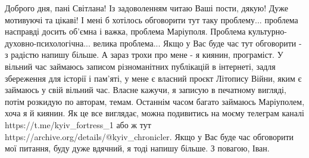  
 
 
 
 

Доброго дня, пані Світлана! Із задоволенням читаю Ваші пости, дякую! Дуже
мотивуючі та цікаві! І мені б хотілось обговорити тут таку проблему... проблема
насправді досить об'ємна і важка, проблема Маріуполя. Проблема
культурно-духовно-психологічна... велика проблема... Якщо у Вас буде час тут
обговорити - з радістю напишу більше. А зараз трохи про мене - я киянин,
програміст. У вільний час займаюсь записом різноманітних публікацій в
інтернеті, задля збереження для історії і пам'яті, у мене є власний проєкт
Літопису Війни, яким є займаюсь у свій вільний час. Власне кажучи, я записую в
печатному вигляді, потім розкидую по авторам, темам. Останнім часом багато
займаюсь Маріуполем, хоча я й киянин. Як це все виглядає, можна подивитись на
моєму телеграм каналі https://t.me/kyiv_fortress_1 або ж тут
https://archive.org/details/@kyiv_chronicler. Якщо у Вас буде час обговорити
мої питання, буду дуже вдячний, я тоді напишу більше. З повагою, Іван.
